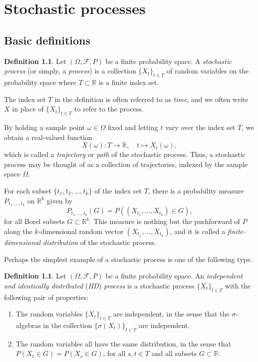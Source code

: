 \documentclass[11pt]{book}
\theoremstyle{definition}
\newtheorem{defn}[thm]{Definition}
\numberwithin{equation}{section}
\begin{document}
\chapter{Stochastic processes}

\section{Basic definitions}

\begin{defn}
	Let $(\Omega, \mathcal{F}, P)$ be a finite probability space. A \textit{stochastic process} (or simply, a \textit{process}) is a collection $\{X_t\}_{t\in T}$ of random variables on the probability space where $T\subset \mathbb{R}$ is a finite index set.
\end{defn}

The index set $T$ in the definition is often referred to as \textit{time}, and we often write $X$ in place of $\{X_t\}_{t\in T}$ to refer to the process.

By holding a sample point $\omega\in \Omega$ fixed and letting $t$ vary over the index set $T$, we obtain a real-valued function
\[
	X(\omega):T \to \mathbb{R}, \quad t\mapsto X_t(\omega),
\]
which is called a \textit{trajectory} or \textit{path} of the stochastic process. Thus, a stochastic process may be thought of as a collection of trajectories, indexed by the sample space $\Omega$.

For each subset $\{t_1,t_2,\ldots,t_k\}$ of the index set $T$, there is a probability measure $P_{t_1,\ldots,t_k}$ on $\mathbb{R}^k$ given by
\[
	P_{t_1,\ldots,t_k}(G) = P\left( (X_{t_1},\ldots,X_{t_k}) \in G \right),
\]
for all Borel subsets $G\subset \mathbb{R}^k$. This measure is nothing but the pushforward of $P$ along the $k$-dimensional random vector $(X_{t_1},\ldots,X_{t_k})$, and it is called a \textit{finite-dimensional distribution} of the stochastic process.

Perhaps the simplest example of a stochastic process is one of the following type.

\begin{defn}
	Let $(\Omega, \mathcal{F}, P)$ be a finite probability space. An \textit{independent and identically distributed} (\textit{IID}) \textit{process} is a stochastic process $\{X_t\}_{t\in T}$ with the following pair of properties:
	\begin{enumerate}
		\item The random variables $\{X_t\}_{t\in T}$ are independent, in the sense that the $\sigma$-algebras in the collection $\{\sigma(X_t)\}_{t\in T}$ are independent.
		\item The random variables all have the same distribution, in the sense that $P(X_t\in G) = P(X_s\in G)$, for all $s,t\in T$ and all subsets $G\subset \mathbb{R}$.
	\end{enumerate}
\end{defn}
\end{document}
